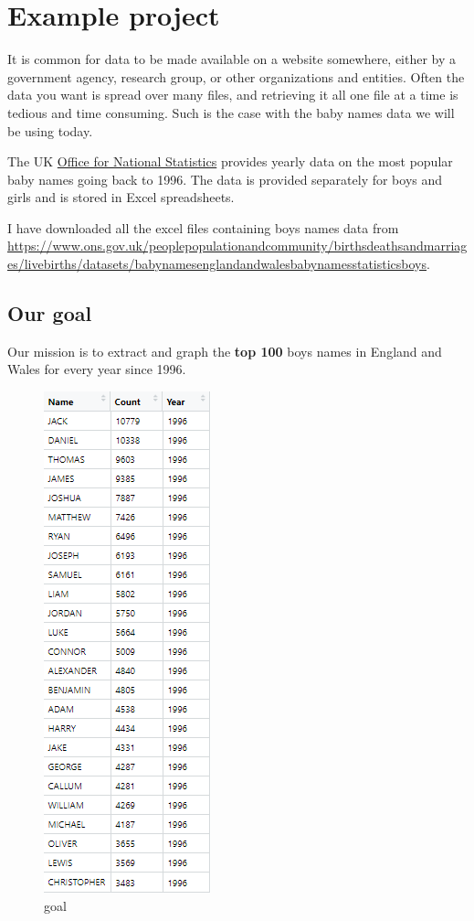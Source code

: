 \documentclass[]{book}
\begin{document}
\section{Example project}\label{example-project}

It is common for data to be made available on a website somewhere,
either by a government agency, research group, or other organizations
and entities. Often the data you want is spread over many files, and
retrieving it all one file at a time is tedious and time consuming. Such
is the case with the baby names data we will be using today.

The UK \href{https://www.ons.gov.uk}{Office for National Statistics}
provides yearly data on the most popular baby names going back to 1996.
The data is provided separately for boys and girls and is stored in
Excel spreadsheets.

I have downloaded all the excel files containing boys names data from
\url{https://www.ons.gov.uk/peoplepopulationandcommunity/birthsdeathsandmarriages/livebirths/datasets/babynamesenglandandwalesbabynamesstatisticsboys}.

\subsection{Our goal}\label{our-goal}

Our mission is to extract and graph the \textbf{top 100} boys names in
England and Wales for every year since 1996.

\begin{figure}
\centering
\includegraphics{R/RDataWrangling/images/goal.png}
\caption{goal}
\end{figure}
\end{document}
